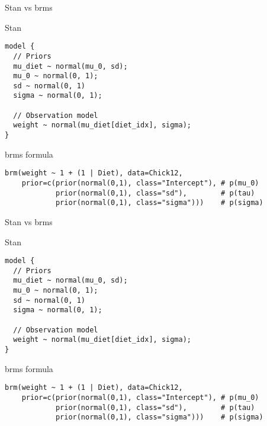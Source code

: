 \documentclass[finnish,english,t]{beamer}
\begin{document}
\begin{frame}[fragile]{Stan vs brms}

  \vspace{-0.5\baselineskip}

  Stan
  
\vspace{-0.5\baselineskip}
{\small
\begin{verbatim}
model {
  // Priors
  mu_diet ~ normal(mu_0, sd);
  mu_0 ~ normal(0, 1);
  sd ~ normal(0, 1)
  sigma ~ normal(0, 1);
  
  // Observation model
  weight ~ normal(mu_diet[diet_idx], sigma);
}
\end{verbatim}

\vspace{-\baselineskip}
{\color{lightgray}\hrulefill}

  brms formula
  \vspace{-0.5\baselineskip}
\begin{verbatim}
brm(weight ~ 1 + (1 | Diet), data=Chick12,
    prior=c(prior(normal(0,1), class="Intercept"), # p(mu_0)
            prior(normal(0,1), class="sd"),        # p(tau)
            prior(normal(0,1), class="sigma")))    # p(sigma)
\end{verbatim}
}

\end{frame}

\begin{frame}[fragile]{Stan vs brms}

  \vspace{-0.5\baselineskip}

  Stan
  
\vspace{-0.5\baselineskip}
{\small
\begin{verbatim}
model {
  // Priors
  mu_diet ~ normal(mu_0, sd);
  mu_0 ~ normal(0, 1);
  sd ~ normal(0, 1)
  sigma ~ normal(0, 1);
  
  // Observation model
  weight ~ normal(mu_diet[diet_idx], sigma);
}
\end{verbatim}

\vspace{-\baselineskip}
{\color{lightgray}\hrulefill}

  brms formula
  \vspace{-0.5\baselineskip}
\begin{verbatim}
brm(weight ~ 1 + (1 | Diet), data=Chick12,
    prior=c(prior(normal(0,1), class="Intercept"), # p(mu_0)
            prior(normal(0,1), class="sd"),        # p(tau)
            prior(normal(0,1), class="sigma")))    # p(sigma)
\end{verbatim}
}

\end{frame}
\end{document}
